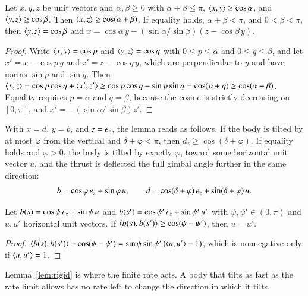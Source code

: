 \begin{lemma}\label{lem:tri}
Let $x,y,z$ be unit vectors and $\alpha,\beta\ge0$ with $\alpha+\beta\le\pi$, $\langle x,y\rangle\ge\cos\alpha$, and
$\langle y,z\rangle\ge\cos\beta$. Then $\langle x,z\rangle\ge\cos(\alpha+\beta)$. If equality holds, $\alpha+\beta<\pi$, and $0<\beta<\pi$, then
$\langle y,z\rangle=\cos\beta$ and $x=\cos\alpha\,y-(\sin\alpha/\sin\beta)(z-\cos\beta\,y)$.
\end{lemma}
\begin{proof}
Write $\langle x,y\rangle=\cos p$ and $\langle y,z\rangle=\cos q$ with $0\le p\le\alpha$ and $0\le q\le\beta$, and let $x'=x-\cos p\,y$ and
$z'=z-\cos q\,y$, which are perpendicular to $y$ and have norms $\sin p$ and $\sin q$. Then
$\langle x,z\rangle=\cos p\cos q+\langle x',z'\rangle\ge\cos p\cos q-\sin p\sin q=\cos(p+q)\ge\cos(\alpha+\beta)$. Equality requires $p=\alpha$
and $q=\beta$, because the cosine is strictly decreasing on $[0,\pi]$, and $x'=-(\sin\alpha/\sin\beta)z'$.
\end{proof}

With $x=d$, $y=b$, and $z=e_z$, the lemma reads as follows. If the body is tilted by at most $\varphi$ from the vertical
and $\delta+\varphi<\pi$, then $d_z\ge\cos(\delta+\varphi)$. If equality holds and $\varphi>0$, the body is tilted by exactly
$\varphi$, toward some horizontal unit vector $u$, and the thrust is deflected the full gimbal angle further in the same
direction:
\begin{equation}\label{eq:extremal}
b=\cos\varphi\,e_z+\sin\varphi\,u,\qquad d=\cos(\delta+\varphi)\,e_z+\sin(\delta+\varphi)\,u .
\end{equation}

\begin{lemma}[Rigidity]\label{lem:rigid}
Let $b(s)=\cos\psi\,e_z+\sin\psi\,u$ and $b(s')=\cos\psi'\,e_z+\sin\psi'\,u'$ with $\psi,\psi'\in(0,\pi)$ and $u,u'$
horizontal unit vectors. If $\langle b(s),b(s')\rangle\ge\cos(\psi-\psi')$, then $u=u'$.
\end{lemma}
\begin{proof}
$\langle b(s),b(s')\rangle-\cos(\psi-\psi')=\sin\psi\sin\psi'\,(\langle u,u'\rangle-1)$, which is nonnegative only if $\langle u,u'\rangle=1$.
\end{proof}
Lemma~\ref{lem:rigid} is where the finite rate acts. A body that tilts as fast as the rate limit allows has no rate left
to change the direction in which it tilts.

